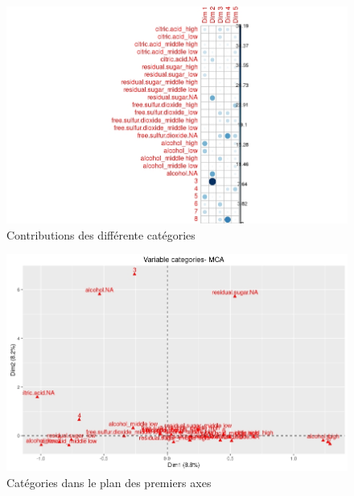 \documentclass[11pt,a4paper]{article}
\begin{document}
\begin{figure}

\includegraphics[width=\textwidth,keepaspectratio]{contrib}

\caption{Contributions des différente catégories}
\label{fig:contrib}
\end{figure}



\begin{figure}

\includegraphics[width=\textwidth,keepaspectratio]{"biplot-mca"}

\caption{Catégories dans le plan des premiers axes}
\label{fig:biplot}
\end{figure}
\end{document}
